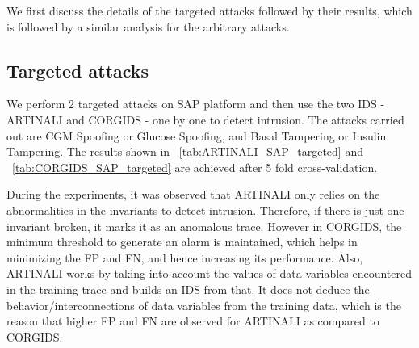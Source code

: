 We first discuss the details of the targeted attacks followed by their results, which is followed by a similar analysis for the arbitrary attacks.

\subsection{Targeted attacks}
We perform 2 targeted attacks on SAP platform and then use the two IDS - ARTINALI and CORGIDS - one by one to detect intrusion. The attacks carried out are CGM Spoofing or Glucose Spoofing, and Basal Tampering or Insulin Tampering. The results shown in ~\autoref{tab:ARTINALI_SAP_targeted} and ~\autoref{tab:CORGIDS_SAP_targeted} are achieved after 5 fold cross-validation.

\begin{table}
\centering
  \caption{Results of intrusion detection by ARTINALI for targeted attack on SAP platform}
  \label{tab:ARTINALI_SAP_targeted}
\end{table}


\begin{table}
\centering
  \caption{Results of intrusion detection by CORGIDS for targeted attack on SAP platform}
  \label{tab:CORGIDS_SAP_targeted}
\end{table}



During the experiments, it was observed that ARTINALI only relies on the abnormalities in the invariants to detect intrusion. Therefore, if there is just one invariant broken, it marks it as an anomalous trace. However in CORGIDS, the minimum threshold to generate an alarm is maintained, which helps in minimizing the FP and FN, and hence increasing its performance. Also, ARTINALI works by taking into account the values of data variables encountered in the training trace and builds an IDS from that. It does not deduce the behavior/interconnections of data variables from the training data, which is the reason that higher FP and FN are observed for ARTINALI as compared to CORGIDS.

